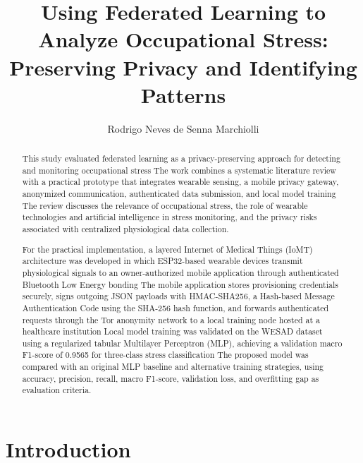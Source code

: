 \documentclass[12pt]{article}
\title{Using Federated Learning to Analyze Occupational Stress: Preserving Privacy and Identifying Patterns}
\author{Rodrigo Neves de Senna Marchiolli\inst{1}}
\begin{document}
 

\maketitle

\begin{abstract}
This study evaluated federated learning as a privacy-preserving approach for detecting and monitoring occupational stress The work combines a systematic literature review with a practical prototype that integrates wearable sensing, a mobile privacy gateway, anonymized communication, authenticated data submission, and local model training The review discusses the relevance of occupational stress, the role of wearable technologies and artificial intelligence in stress monitoring, and the privacy risks associated with centralized physiological data collection.

For the practical implementation, a layered Internet of Medical Things (IoMT) architecture was developed in which ESP32-based wearable devices transmit physiological signals to an owner-authorized mobile application through authenticated Bluetooth Low Energy bonding The mobile application stores provisioning credentials securely, signs outgoing JSON payloads with HMAC-SHA256, a Hash-based Message Authentication Code using the SHA-256 hash function, and forwards authenticated requests through the Tor anonymity network to a local training node hosted at a healthcare institution Local model training was validated on the WESAD dataset using a regularized tabular Multilayer Perceptron (MLP), achieving a validation macro F1-score of 0.9565 for three-class stress classification The proposed model was compared with an original MLP baseline and alternative training strategies, using accuracy, precision, recall, macro F1-score, validation loss, and overfitting gap as evaluation criteria.
\end{abstract}
    

\section{Introduction}
\end{document}
